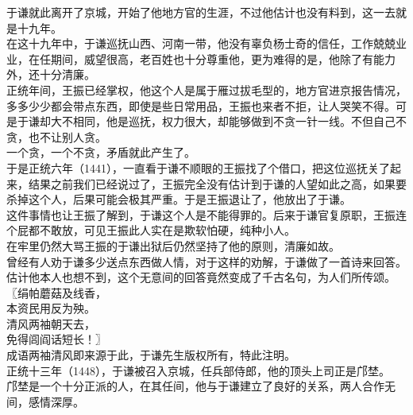 \begin{multicols}{\theparacolNo}
于谦就此离开了京城，开始了他地方官的生涯，不过他估计也没有料到，这一去就是十九年。\\

在这十九年中，于谦巡抚山西、河南一带，他没有辜负杨士奇的信任，工作兢兢业业，在任期间，威望很高，老百姓也十分尊重他，更为难得的是，他除了有能力外，还十分清廉。\\

正统年间，王振已经掌权，他这个人是属于雁过拔毛型的，地方官进京报告情况，多多少少都会带点东西，即使是些日常用品，王振也来者不拒，让人哭笑不得。可是于谦却大不相同，他是巡抚，权力很大，却能够做到不贪一针一线。不但自己不贪，也不让别人贪。\\

一个贪，一个不贪，矛盾就此产生了。\\

于是正统六年（1441），一直看于谦不顺眼的王振找了个借口，把这位巡抚关了起来，结果之前我们已经说过了，王振完全没有估计到于谦的人望如此之高，如果要杀掉这个人，后果可能会极其严重。于是王振退让了，他放出了于谦。\\

这件事情也让王振了解到，于谦这个人是不能得罪的。后来于谦官复原职，王振连个屁都不敢放，可见王振此人实在是欺软怕硬，纯种小人。\\

在牢里仍然大骂王振的于谦出狱后仍然坚持了他的原则，清廉如故。\\

曾经有人劝于谦多少送点东西做人情，对于这样的劝解，于谦做了一首诗来回答。\\

估计他本人也想不到，这个无意间的回答竟然变成了千古名句，为人们所传颂。\\

〖绢帕蘑菇及线香，\\

本资民用反为殃。\\

清风两袖朝天去，\\

免得闾阎话短长！〗\\

成语两袖清风即来源于此，于谦先生版权所有，特此注明。\\

正统十三年（1448），于谦被召入京城，任兵部侍郎，他的顶头上司正是邝埜。\\

邝埜是一个十分正派的人，在其任间，他与于谦建立了良好的关系，两人合作无间，感情深厚。\\


\end{multicols}
